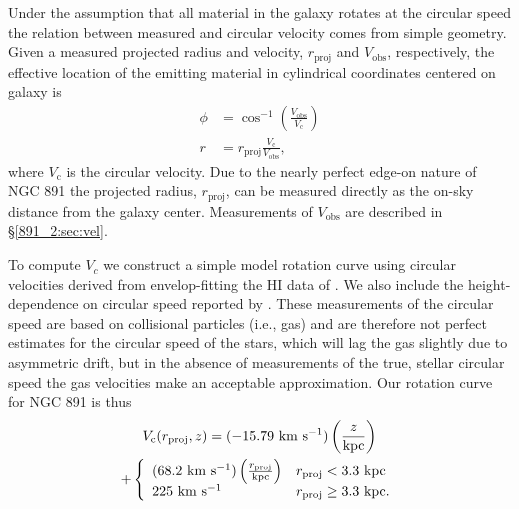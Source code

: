 Under the assumption that all material in the galaxy rotates at the
circular speed the relation between measured and circular velocity
comes from simple geometry. Given a measured projected radius and
velocity, $r_{\mathrm{proj}}$ and $V_{\mathrm{obs}}$, respectively,
the effective location of the emitting material in cylindrical
coordinates centered on galaxy is
\begin{align}
  \label{891_2:eq:vel_LOS}
  \phi &= \cos^{-1}\left(\frac{V_{\mathrm{obs}}}{V_{\mathrm{c}}}\right)\\
  r &= r_{\mathrm{proj}}\frac{V_{\mathrm{c}}}{V_{\mathrm{obs}}},
\end{align}
where $V_{\mathrm{c}}$ is the circular velocity. Due to the nearly
perfect edge-on nature of NGC 891 the projected radius,
$r_\mathrm{proj}$, can be measured directly as the on-sky distance
from the galaxy center. Measurements of $V_\mathrm{obs}$ are described
in \S\ref{891_2:sec:vel}.

To compute $V_c$ we construct a simple model rotation curve using
circular velocities derived from envelop-fitting the HI data of
\citet{Swaters97}. We also include the height-dependence on circular
speed reported by \citet{Oosterloo07}. These measurements of the
circular speed are based on collisional particles (i.e., gas) and are
therefore not perfect estimates for the circular speed of the stars,
which will lag the gas slightly due to asymmetric drift, but in the
absence of measurements of the true, stellar circular speed the gas
velocities make an acceptable approximation. Our rotation curve for
NGC 891 is thus
\begin{multline}
  V_{\mathrm{c}}(r_{\mathrm{proj}},z) =
  (-15.79~\mathrm{\mathrm{km\ s^{-1}}} )\left(\frac{z}{\mathrm{kpc}}\right) \\ 
  + \left\{
    \begin{array}{ll}
      (68.2~\mathrm{\mathrm{km\ s^{-1}}} )\left(\frac{r_{\mathrm{proj}}}{\mathrm{kpc}}\right)
      & r_{\mathrm{proj}} < 3.3~\mathrm{kpc} \\ 225~\mathrm{\mathrm{km\ s^{-1}}}  &
      r_{\mathrm{proj}} \geq 3.3~\mathrm{kpc} .\\
    \end{array}
    \right.
\end{multline}

